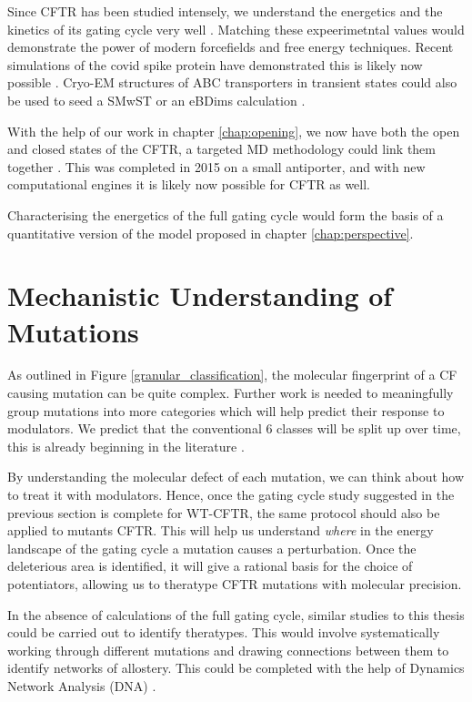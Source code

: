 Since CFTR has been studied intensely, we understand the energetics and the kinetics of its gating cycle very well \cite{csanady2017}. Matching these expeerimetntal values would demonstrate the power of modern forcefields and free energy techniques. Recent simulations of the covid spike protein have demonstrated this is likely now possible \cite{casalino2021}. Cryo-EM structures of ABC transporters in transient states could also be used to seed a SMwST or an eBDims calculation \cite{hofmann2019, orellana2016, roux2021, pan2008}. 

With the help of our work in chapter \ref{chap:opening}, we now have both the open and closed states of the CFTR, a targeted MD methodology could link them together \cite{zhang2018, liu2017}. This was completed in 2015 on a small antiporter, and with new computational engines it is likely now possible for CFTR as well.

Characterising the energetics of the full gating cycle would form the basis of a quantitative version of the model proposed in chapter \ref{chap:perspective}.




\section{Mechanistic Understanding of Mutations}
As outlined in Figure \ref{granular_classification}, the molecular fingerprint of a CF causing mutation can be quite complex. Further work is needed to meaningfully group mutations into more categories which will help predict their response to modulators. We predict that the conventional 6 classes will be split up over time, this is already beginning in the literature \cite{veit2016}. 

By understanding the molecular defect of each mutation, we can think about how to treat it with modulators. Hence,  once the gating cycle study suggested in the previous section is complete for WT-CFTR, the same protocol should also be applied to mutants CFTR. This will help us understand \textit{where} in the energy landscape of the gating cycle a mutation causes a perturbation. Once the deleterious area is identified, it will give a rational basis for the choice of potentiators, allowing us to theratype CFTR mutations with molecular precision.

In the absence of calculations of the full gating cycle, similar studies to this thesis could be carried out to identify theratypes. This would involve systematically working through different mutations and drawing connections between them to identify networks of allostery. This could be completed with the help of Dynamics Network Analysis (DNA) \cite{melo2020}. 

